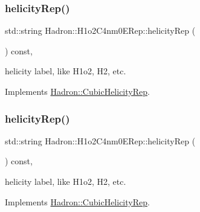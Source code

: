 \mbox{\label{structHadron_1_1H1o2C4nm0ERep_a55678e61a56cf1cb02bc550ab0de0c55}} 
\subsubsection{\texorpdfstring{helicityRep()}{helicityRep()}\hspace{0.1cm}{\footnotesize\ttfamily [1/3]}}
{\footnotesize\ttfamily std\+::string Hadron\+::\+H1o2\+C4nm0\+E\+Rep\+::helicity\+Rep (\begin{DoxyParamCaption}{ }\end{DoxyParamCaption}) const\hspace{0.3cm}{\ttfamily [inline]}, {\ttfamily [virtual]}}

helicity label, like H1o2, H2, etc. 

Implements \mbox{\hyperlink{structHadron_1_1CubicHelicityRep_af1096946b7470edf0a55451cc662f231}{Hadron\+::\+Cubic\+Helicity\+Rep}}.

\mbox{\label{structHadron_1_1H1o2C4nm0ERep_a55678e61a56cf1cb02bc550ab0de0c55}} 
\subsubsection{\texorpdfstring{helicityRep()}{helicityRep()}\hspace{0.1cm}{\footnotesize\ttfamily [2/3]}}
{\footnotesize\ttfamily std\+::string Hadron\+::\+H1o2\+C4nm0\+E\+Rep\+::helicity\+Rep (\begin{DoxyParamCaption}{ }\end{DoxyParamCaption}) const\hspace{0.3cm}{\ttfamily [inline]}, {\ttfamily [virtual]}}

helicity label, like H1o2, H2, etc. 

Implements \mbox{\hyperlink{structHadron_1_1CubicHelicityRep_af1096946b7470edf0a55451cc662f231}{Hadron\+::\+Cubic\+Helicity\+Rep}}.

\mbox{\label{structHadron_1_1H1o2C4nm0ERep_a55678e61a56cf1cb02bc550ab0de0c55}} 
